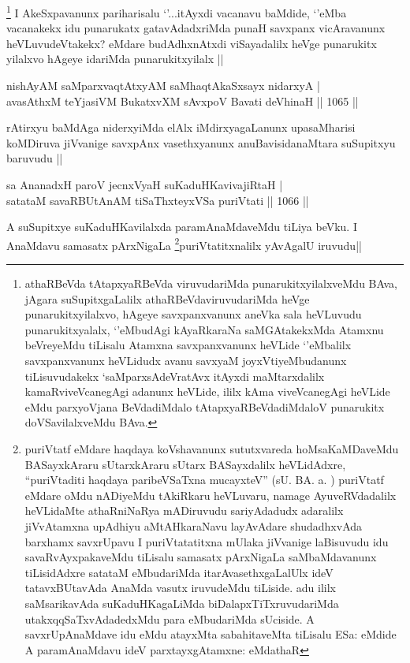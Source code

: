 \begin{artha}
\footnote{athaRBeVda tAtapxyaRBeVda viruvudariMda punarukitxyilalxveMdu BAva, jAgara suSupitxgaLalilx athaRBeVdaviruvudariMda heVge punarukitxyilalxvo, hAgeye savxpanxvanunx aneVka sala heVLuvudu punarukitxyalalx, `\stext'eMbudAgi kAyaRkaraNa saMGAtakekxMda Atamxnu beVreyeMdu tiLisalu Atamxna savxpanxvanunx heVLide `\stext'eMbalilx savxpanxvanunx heVLidudx avanu savxyaM joyxVtiyeMbudanunx tiLisuvudakekx `saMparxsAdeVratAvx itAyxdi maMtarxdalilx kamaRviveVcanegAgi adanunx heVLide, ililx kAma viveVcanegAgi heVLide eMdu parxyoVjana BeVdadiMdalo tAtapxyaRBeVdadiMdaloV punarukitx doVSavilalxveMdu BAva.}
 I AkeSxpavanunx pariharisalu `\stext'...itAyxdi vacanavu baMdide, `\stext'eMba vacanakekx idu punarukatx gatavAdadxriMda punaH savxpanx vicAravanunx heVLuvudeVtakekx? eMdare budAdhxnAtxdi viSayadalilx heVge punarukitx yilalxvo hAgeye idariMda punarukitxyilalx ||
\end{artha}


\begin{shl}
nishAyAM saMparxvaqtAtxyAM saMhaqtAkaSxsayx nidarxyA | \\
avasAthxM teYjasiVM BukatxvXM sAvxpoV Bavati deVhinaH \hfill||  1065 ||  
\end{shl}

\begin{artha}
rAtirxyu baMdAga niderxyiMda elAlx iMdirxyagaLanunx upasaMharisi koMDiruva jiVvanige savxpAnx vasethxyanunx anuBavisidanaMtara suSupitxyu baruvudu ||
\end{artha}

\begin{shl}
sa AnanadxH paroV jecnxVyaH suKaduHKavivajiRtaH | \\
satataM savaRBUtAnAM tiSaThxteyxVSa puriVtati \hfill||  1066 ||  
\end{shl}

\begin{artha}
A suSupitxye suKaduHKavilalxda paramAnaMdaveMdu tiLiya beVku. I AnaMdavu samasatx pArxNigaLa \footnote{puriVtatf eMdare haqdaya koVshavanunx sututxvareda hoMsaKaMDaveMdu BASayxkAraru sUtarxkAraru sUtarx BASayxdalilx heVLidAdxre, ``puriVtaditi haqdaya paribeVSaTxna mucayxteV'' (sU. BA. a. ) puriVtatf eMdare oMdu nADiyeMdu tAkiRkaru heVLuvaru, namage AyuveRVdadalilx heVLidaMte athaRniNaRya mADiruvudu sariyAdadudx adaralilx jiVvAtamxna upAdhiyu aMtAHkaraNavu layAvAdare shudadhxvAda barxhamx savxrUpavu I puriVtatatitxna mUlaka jiVvanige laBisuvudu idu savaRvAyxpakaveMdu tiLisalu samasatx pArxNigaLa saMbaMdavanunx tiLisidAdxre satataM eMbudariMda itarAvasethxgaLalUlx ideV tatavxBUtavAda AnaMda vasutx iruvudeMdu tiLiside. adu ililx saMsarikavAda suKaduHKagaLiMda biDalapxTiTxruvudariMda utakxqqSaTxvAdadedxMdu para eMbudariMda sUciside. A savxrUpAnaMdave idu eMdu atayxMta sabahitaveMta tiLisalu ESa: eMdide A paramAnaMdavu ideV parxtayxgAtamxne: eMdathaR}puriVtatitxnalilx yAvAgalU iruvudu||
\end{artha}

